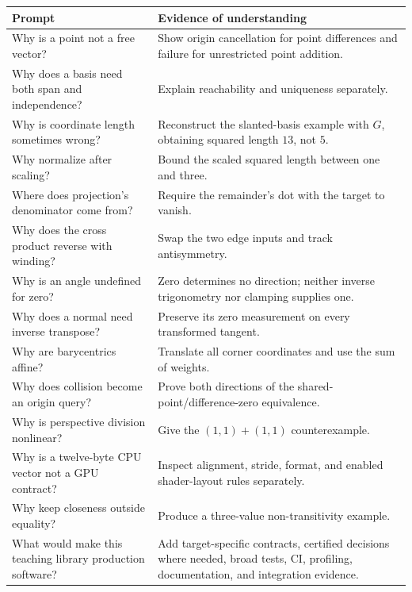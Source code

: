 {\def\LTcaptype{none} %
\begin{longtable}[]{@{}
  >{\raggedright\arraybackslash}p{}
  >{\raggedright\arraybackslash}p{}@{}}
\toprule\noalign{}
\begin{minipage}[b]{\linewidth}\raggedright
Prompt
\end{minipage} & \begin{minipage}[b]{\linewidth}\raggedright
Evidence of understanding
\end{minipage} \\
\midrule\noalign{}
\endhead
\bottomrule\noalign{}
\endlastfoot
Why is a point not a free vector? & Show origin cancellation for point differences and failure for unrestricted point addition. \\
Why does a basis need both span and independence? & Explain reachability and uniqueness separately. \\
Why is coordinate length sometimes wrong? & Reconstruct the slanted-basis example with \(G\), obtaining squared length \(13\), not \(5\). \\
Why normalize after scaling? & Bound the scaled squared length between one and three. \\
Where does projection's denominator come from? & Require the remainder's dot with the target to vanish. \\
Why does the cross product reverse with winding? & Swap the two edge inputs and track antisymmetry. \\
Why is an angle undefined for zero? & Zero determines no direction; neither inverse trigonometry nor clamping supplies one. \\
Why does a normal need inverse transpose? & Preserve its zero measurement on every transformed tangent. \\
Why are barycentrics affine? & Translate all corner coordinates and use the sum of weights. \\
Why does collision become an origin query? & Prove both directions of the shared-point/difference-zero equivalence. \\
Why is perspective division nonlinear? & Give the \((1,1)+(1,1)\) counterexample. \\
Why is a twelve-byte CPU vector not a GPU contract? & Inspect alignment, stride, format, and enabled shader-layout rules separately. \\
Why keep closeness outside equality? & Produce a three-value non-transitivity example. \\
What would make this teaching library production software? & Add target-specific contracts, certified decisions where needed, broad tests, CI, profiling, documentation, and integration evidence. \\
\end{longtable}
}

